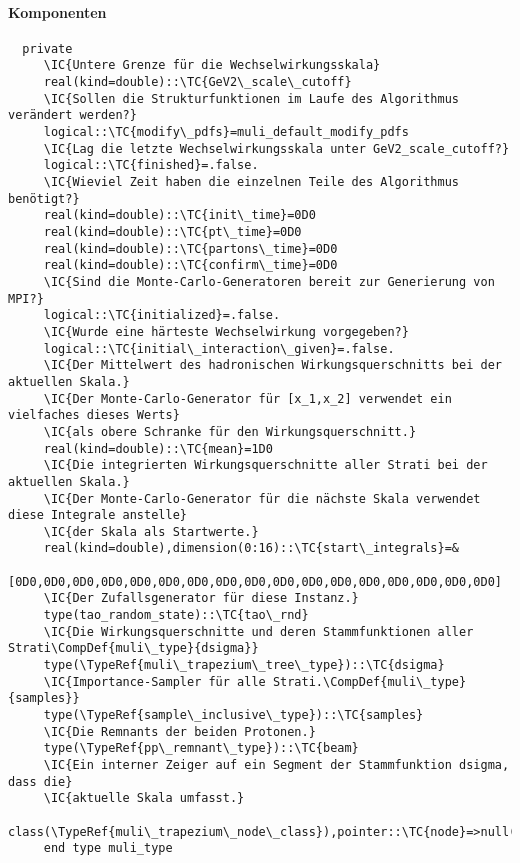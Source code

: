 \paragraph{Komponenten}
\begin{Verbatim}
  private
     \IC{Untere Grenze für die Wechselwirkungsskala}
     real(kind=double)::\TC{GeV2\_scale\_cutoff}
     \IC{Sollen die Strukturfunktionen im Laufe des Algorithmus verändert werden?}
     logical::\TC{modify\_pdfs}=muli_default_modify_pdfs
     \IC{Lag die letzte Wechselwirkungsskala unter GeV2_scale_cutoff?}
     logical::\TC{finished}=.false.
     \IC{Wieviel Zeit haben die einzelnen Teile des Algorithmus benötigt?}
     real(kind=double)::\TC{init\_time}=0D0
     real(kind=double)::\TC{pt\_time}=0D0
     real(kind=double)::\TC{partons\_time}=0D0
     real(kind=double)::\TC{confirm\_time}=0D0
     \IC{Sind die Monte-Carlo-Generatoren bereit zur Generierung von MPI?}
     logical::\TC{initialized}=.false.
     \IC{Wurde eine härteste Wechselwirkung vorgegeben?}
     logical::\TC{initial\_interaction\_given}=.false.
     \IC{Der Mittelwert des hadronischen Wirkungsquerschnitts bei der aktuellen Skala.}
     \IC{Der Monte-Carlo-Generator für [x_1,x_2] verwendet ein vielfaches dieses Werts}
     \IC{als obere Schranke für den Wirkungsquerschnitt.}
     real(kind=double)::\TC{mean}=1D0
     \IC{Die integrierten Wirkungsquerschnitte aller Strati bei der aktuellen Skala.}
     \IC{Der Monte-Carlo-Generator für die nächste Skala verwendet diese Integrale anstelle}
     \IC{der Skala als Startwerte.}
     real(kind=double),dimension(0:16)::\TC{start\_integrals}=&
          [0D0,0D0,0D0,0D0,0D0,0D0,0D0,0D0,0D0,0D0,0D0,0D0,0D0,0D0,0D0,0D0,0D0]
     \IC{Der Zufallsgenerator für diese Instanz.}
     type(tao_random_state)::\TC{tao\_rnd}
     \IC{Die Wirkungsquerschnitte und deren Stammfunktionen aller Strati\CompDef{muli\_type}{dsigma}}
     type(\TypeRef{muli\_trapezium\_tree\_type})::\TC{dsigma}
     \IC{Importance-Sampler für alle Strati.\CompDef{muli\_type}{samples}}
     type(\TypeRef{sample\_inclusive\_type})::\TC{samples}
     \IC{Die Remnants der beiden Protonen.}
     type(\TypeRef{pp\_remnant\_type})::\TC{beam}
     \IC{Ein interner Zeiger auf ein Segment der Stammfunktion dsigma, dass die}
     \IC{aktuelle Skala umfasst.}
     class(\TypeRef{muli\_trapezium\_node\_class}),pointer::\TC{node}=>null()
     end type muli_type
\end{Verbatim}
